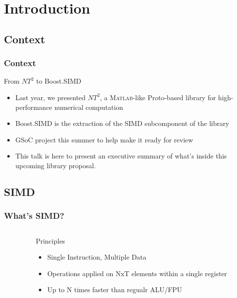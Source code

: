 
\section{Introduction}

\subsection{Context}
\frame
{
  \frametitle{Context}
  \begin{block}{From $NT^2$ to Boost.SIMD}
  \begin{itemize}
  \footnotesize
  \item Last year, we presented $NT^2$, a \textsc{Matlab}-like Proto-based library
		      for high-performance numerical computation
  \item Boost.SIMD is the extraction of the SIMD subcomponent of the
		      library
   \item GSoC project this summer to help make it ready for review 
  \item This talk is here to present an executive summary of what's inside this
upcoming library proposal.
  \end{itemize}
  \end{block}{}
}

\subsection{SIMD}
\frame
{
  \frametitle{What's SIMD?}
  \begin{columns}[c] 
  \begin{column}{6cm} 
  \end{column} 
  \begin{column}{4cm} 
  \begin{block}{Principles}
   \footnotesize
	\begin{itemize}
		\item Single Instruction, Multiple Data
		\item Operations applied on NxT elements within a single register
		\item Up to N times faster than regualr ALU/FPU
	\end{itemize}
  \end{block}{}	
  \end{column} 
  \end{columns} 
}

